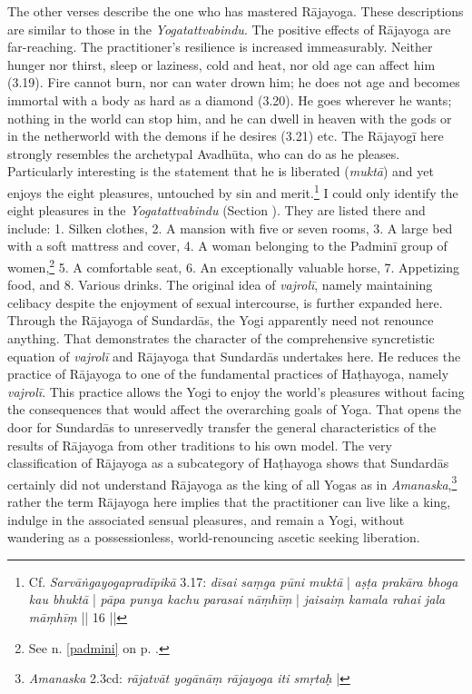 The other verses describe the one who has mastered Rājayoga. These descriptions are similar to those in the \emph{Yogatattvabindu}. The positive effects of Rājayoga are far-reaching. The practitioner's resilience is increased immeasurably. Neither hunger nor thirst, sleep or laziness, cold and heat, nor old age can affect him (3.19). Fire cannot burn, nor can water drown him; he does not age and becomes immortal with a body as hard as a diamond (3.20). He goes wherever he wants; nothing in the world can stop him, and he can dwell in heaven with the gods or in the netherworld with the demons if he desires (3.21) etc. The Rājayogī here strongly resembles the archetypal Avadhūta, who can do as he pleases.
Particularly interesting is the statement that he is liberated (\textit{muktā}) and yet enjoys the eight pleasures, untouched by sin and merit.\footnote{Cf. \emph{Sarvāṅgayogapradīpikā} 3.17: \textit{dīsai saṃga pūni muktā} | \textit{aṣṭa prakāra bhoga kau bhuktā} | \textit{pāpa punya kachu parasai nāṃhīṃ} | \textit{jaisaiṃ kamala rahai jala māṃhīṃ} || 16 ||} I could only identify the eight pleasures in the \textit{Yogatattvabindu} (Section ). They are listed there and include: 1. Silken clothes, 2. A mansion with five or seven rooms, 3. A large bed with a soft mattress and cover, 4. A woman belonging to the Padminī group of women,\footnote{See n. \ref{padmini} on p. \pageref{padmini}.} 5. A comfortable seat, 6. An exceptionally valuable horse, 7. Appetizing food, and 8. Various drinks. The original idea of \textit{vajrolī}, namely maintaining celibacy despite the enjoyment of sexual intercourse, is further expanded here. Through the Rājayoga of Sundardās, the Yogi apparently need not renounce anything.
That demonstrates the character of the comprehensive syncretistic equation of \textit{vajrolī} and Rājayoga that Sundardās undertakes here. He reduces the practice of Rājayoga to one of the fundamental practices of Haṭhayoga, namely \textit{vajrolī}. This practice allows the Yogi to enjoy the world's pleasures without facing the consequences that would affect the overarching goals of Yoga. That opens the door for Sundardās to unreservedly transfer the general characteristics of the results of Rājayoga from other traditions to his own model. The very classification of Rājayoga as a subcategory of Haṭhayoga shows that Sundardās certainly did not understand Rājayoga as the king of all Yogas as in \textit{Amanaska},\footnote{\textit{Amanaska} 2.3cd: \textit{rājatvāt yogānāṃ rājayoga iti smṛtaḥ} |} rather the term Rājayoga here implies that the practitioner can live like a king, indulge in the associated sensual pleasures, and remain a Yogi, without wandering as a possessionless, world-renouncing ascetic seeking liberation.

